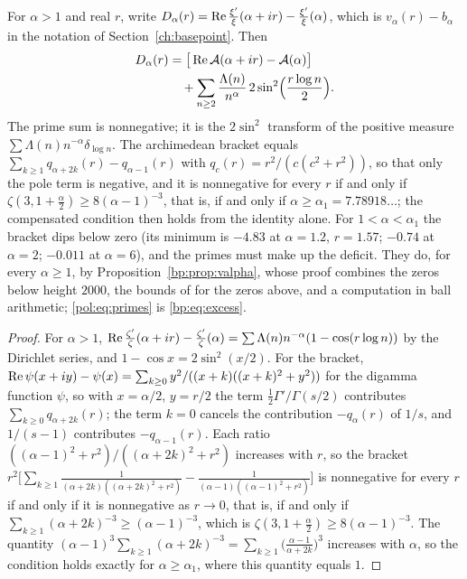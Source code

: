 \begin{proposition}\label{pol:prop:primes}
For $\alpha>1$ and real $r$, write $D_\alpha(r)=\operatorname{Re}\frac{\xi'}{\xi}(\alpha+ir)-\frac{\xi'}{\xi}(\alpha)$, which is $v_\alpha(r)-b_\alpha$ in the notation of Section~\ref{ch:basepoint}. Then
\begin{equation}\label{pol:eq:primes}
\begin{split}
D_\alpha(r)&=\big[\operatorname{Re}\mathcal A(\alpha+ir)-\mathcal A(\alpha)\big]\\
&\quad+\sum_{n\ge2}\frac{\Lambda(n)}{n^\alpha}\,2\sin^2\!\Big(\frac{r\log n}{2}\Big).
\end{split}
\end{equation}
The prime sum is nonnegative; it is the $2\sin^2$ transform of the positive measure $\sum\Lambda(n)n^{-\alpha}\delta_{\log n}$. The archimedean bracket equals $\sum_{k\ge1}q_{\alpha+2k}(r)-q_{\alpha-1}(r)$ with $q_c(r)=r^2/(c(c^2+r^2))$, so that only the pole term is negative, and it is nonnegative for every $r$ if and only if $\zeta(3,1+\frac\alpha2)\ge8(\alpha-1)^{-3}$, that is, if and only if $\alpha\ge\alpha_1=7.78918\ldots$; the compensated condition then holds from the identity alone. For $1<\alpha<\alpha_1$ the bracket dips below zero (its minimum is $-4.83$ at $\alpha=1.2$, $r=1.57$; $-0.74$ at $\alpha=2$; $-0.011$ at $\alpha=6$), and the primes must make up the deficit. They do, for every $\alpha\ge1$, by Proposition~\ref{bp:prop:valpha}, whose proof combines the zeros below height $2000$, the bounds of \cite{HSW22} for the zeros above, and a computation in ball arithmetic; \eqref{pol:eq:primes} is \eqref{bp:eq:excess}.
\end{proposition}

\begin{proof}
For $\alpha>1$, $\operatorname{Re}\frac{\zeta'}{\zeta}(\alpha+ir)-\frac{\zeta'}{\zeta}(\alpha)=\sum\Lambda(n)n^{-\alpha}(1-\cos(r\log n))$ by the Dirichlet series, and $1-\cos x=2\sin^2(x/2)$. For the bracket, $\operatorname{Re}\psi(x+iy)-\psi(x)=\sum_{k\ge0}y^2/((x+k)((x+k)^2+y^2))$ for the digamma function $\psi$, so with $x=\alpha/2$, $y=r/2$ the term $\frac12\Gamma'/\Gamma(s/2)$ contributes $\sum_{k\ge0}q_{\alpha+2k}(r)$; the term $k=0$ cancels the contribution $-q_\alpha(r)$ of $1/s$, and $1/(s-1)$ contributes $-q_{\alpha-1}(r)$. Each ratio $((\alpha-1)^2+r^2)/((\alpha+2k)^2+r^2)$ increases with $r$, so the bracket $r^2\big[\sum_{k\ge1}\frac{1}{(\alpha+2k)((\alpha+2k)^2+r^2)}-\frac{1}{(\alpha-1)((\alpha-1)^2+r^2)}\big]$ is nonnegative for every $r$ if and only if it is nonnegative as $r\to0$, that is, if and only if $\sum_{k\ge1}(\alpha+2k)^{-3}\ge(\alpha-1)^{-3}$, which is $\zeta(3,1+\frac\alpha2)\ge8(\alpha-1)^{-3}$. The quantity $(\alpha-1)^3\sum_{k\ge1}(\alpha+2k)^{-3}=\sum_{k\ge1}\big(\frac{\alpha-1}{\alpha+2k}\big)^3$ increases with $\alpha$, so the condition holds exactly for $\alpha\ge\alpha_1$, where this quantity equals $1$.
\end{proof}


